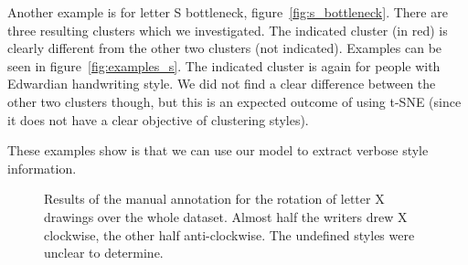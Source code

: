   \par Another example is for letter S bottleneck, figure~\ref{fig:s_bottleneck}. There are three resulting clusters which we investigated. The indicated cluster (in red) is clearly different from the other two clusters (not indicated). Examples can be seen in figure~\ref{fig:examples_s}. The indicated cluster is again for people with Edwardian handwriting style. We did not find a clear difference between the other two clusters though, but this is an expected outcome of using t-SNE (since it does not have a clear objective of clustering styles).

  \par These examples show is that we can use our model to extract verbose style information.
  \begin{figure}[htbp!]
      \centering
      \caption{Results of the manual annotation for the rotation of letter X drawings over the whole dataset. Almost half the writers drew X clockwise, the other half anti-clockwise. The undefined styles were unclear to determine.}
      \label{fig:x_rotation}
  \end{figure}

